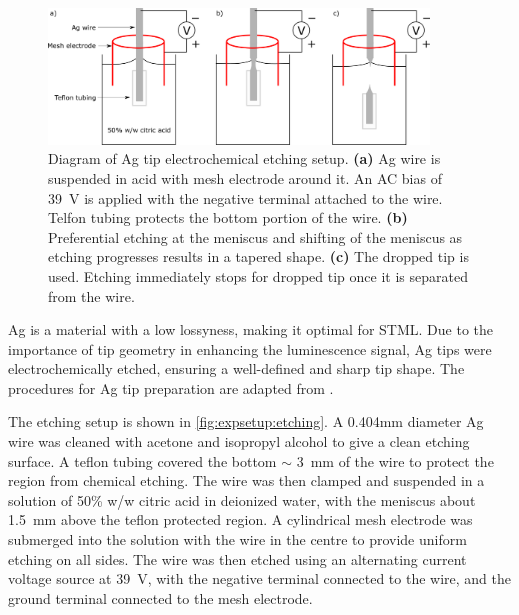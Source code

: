 \begin{figure} [H]
    \centering
    
    \includegraphics[width=0.9\textwidth]{pictures/etch_diagram.png}
    
    \caption{Diagram of Ag tip electrochemical etching setup. \textbf{(a)} Ag wire is suspended in acid with mesh electrode around it. An AC bias of \SI{39}{V} is applied with the negative terminal attached to the wire. Telfon tubing protects the bottom portion of the wire. \textbf{(b)} Preferential etching at the meniscus and shifting of the meniscus as etching progresses results in a tapered shape. \textbf{(c)} The dropped tip is used. Etching immediately stops for dropped tip once it is separated from the wire. }
    \label{fig:expsetup:etching}
\end{figure}

Ag is a material with a low lossyness, making it optimal for \ac{STML}. Due to the importance of tip geometry in enhancing the luminescence signal, Ag tips were electrochemically etched, ensuring a well-defined and sharp tip shape. The procedures for Ag tip preparation are adapted from \citep{roussy2016coupling, zhang2011fabrication}. 

The etching setup is shown in \autoref{fig:expsetup:etching}. A 0.404mm diameter Ag wire was cleaned with acetone and isopropyl alcohol to give a clean etching surface. A teflon tubing covered the bottom $\sim$ \SI{3}{mm} of the wire to protect the region from chemical etching. The wire was then clamped and suspended in a solution of 50\% w/w citric acid in deionized water, with the meniscus about \SI{1.5}{mm} above the teflon protected region. A cylindrical mesh electrode was submerged into the solution with the wire in the centre to provide uniform etching on all sides. The wire was then etched using an alternating current voltage source at \SI{39}{V}, with the negative terminal connected to the wire, and the ground terminal connected to the mesh electrode. 

